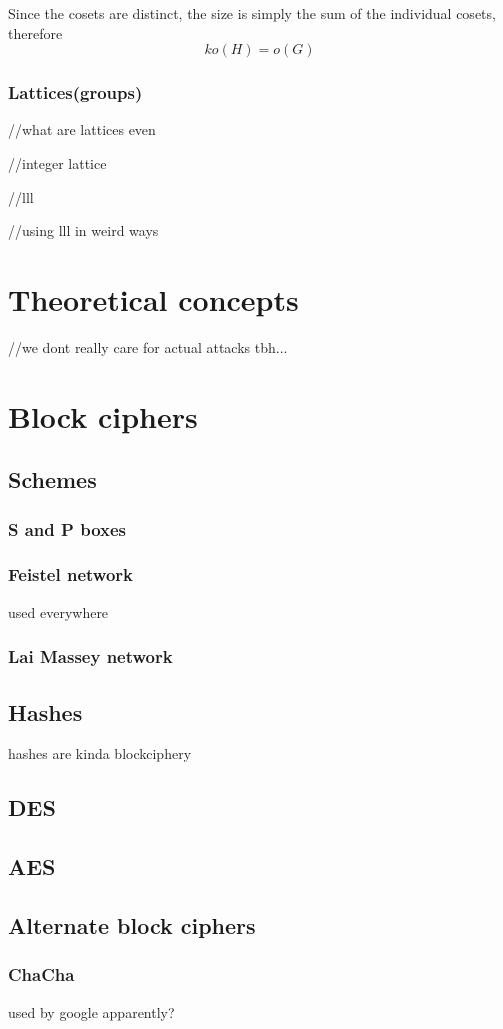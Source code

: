 \documentclass{report}
\begin{document}
Since the cosets are distinct, the size is simply the sum of the individual cosets, therefore
$$ko(H)=o(G)$$

\section{Lattices(groups)}
//what are lattices even

//integer lattice

//lll

//using lll in weird ways
\part{Theoretical concepts}
//we dont really care for actual attacks tbh...
\part{Block ciphers}
\chapter{Schemes}
\section{S and P boxes}
\section{Feistel network}
used everywhere
\section{Lai Massey network}
\chapter{Hashes}
hashes are kinda blockciphery
\chapter{DES}
\chapter{AES}
\chapter{Alternate block ciphers}
\section{ChaCha}
used by google apparently?
\end{document}
